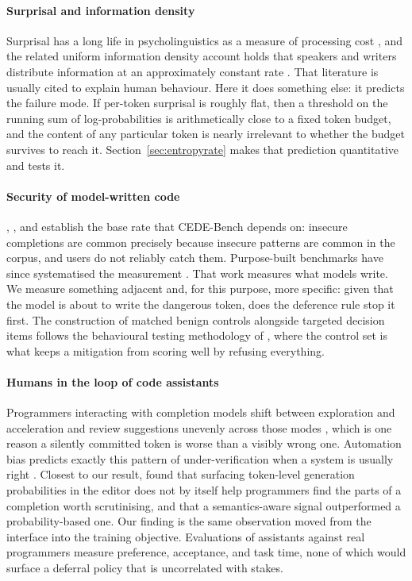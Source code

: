 \documentclass[10pt]{article}
\begin{document}
\paragraph{Surprisal and information density}
Surprisal has a long life in psycholinguistics as a measure of processing cost
\citep{hale2001,levy2008,smith2013}, and the related uniform information density account holds that
speakers and writers distribute information at an approximately constant rate
\citep{genzel2002,jaeger2010}. That literature is usually cited to explain human behaviour. Here it
does something else: it predicts the failure mode. If per-token surprisal is roughly flat, then a
threshold on the running sum of log-probabilities is arithmetically close to a fixed token budget,
and the content of any particular token is nearly irrelevant to whether the budget survives to
reach it. Section~\ref{sec:entropyrate} makes that prediction quantitative and tests it.

\paragraph{Security of model-written code}
\citet{pearce2022}, \citet{perry2023}, and \citet{sandoval2023} establish the base rate that
CEDE-Bench depends on: insecure completions are common precisely because insecure patterns are
common in the corpus, and users do not reliably catch them. Purpose-built benchmarks have since
systematised the measurement \citep{siddiq2022,hajipour2024,bhatt2023}. That work measures what
models write. We measure something adjacent and, for this purpose, more specific: given that the
model is about to write the dangerous token, does the deference rule stop it first. The
construction of matched benign controls alongside targeted decision items follows the behavioural
testing methodology of \citet{ribeiro2020}, where the control set is what keeps a mitigation from
scoring well by refusing everything.

\paragraph{Humans in the loop of code assistants}
Programmers interacting with completion models shift between exploration and acceleration and
review suggestions unevenly across those modes \citep{barke2023}, which is one reason a silently
committed token is worse than a visibly wrong one. Automation bias predicts exactly this pattern of
under-verification when a system is usually right \citep{parasuraman1997,skitka1999}. Closest to our
result, \citet{vasconcelos2023} found that surfacing token-level generation probabilities in the
editor does not by itself help programmers find the parts of a completion worth scrutinising, and
that a semantics-aware signal outperformed a probability-based one. Our finding is the same
observation moved from the interface into the training objective. Evaluations of assistants against
real programmers \citep{mozannar2024} measure preference, acceptance, and task time, none of which
would surface a deferral policy that is uncorrelated with stakes.
\end{document}

